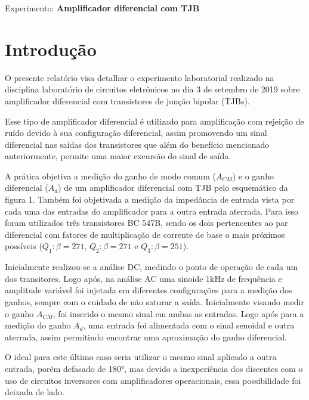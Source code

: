 \begin{center}
\large Experimento: \textbf{Amplificador diferencial com TJB}
\end{center}


\section{Introdução}



O presente relatório visa detalhar o experimento laboratorial realizado na disciplina laboratório de circuitos eletrônicos no dia 3 de setembro de 2019 sobre amplificador diferencial com transistores de junção bipolar (TJBs). 
 
Esse tipo de amplificador diferencial é utilizado para amplificação com rejeição de ruído devido à sua configuração diferencial, assim promovendo um sinal diferencial nas saídas dos transistores que além do benefício mencionado anteriormente, permite uma maior excursão do sinal de saída.

A prática objetiva a medição do ganho de modo comum ($A_{CM}$) e o ganho diferencial ($A_d$) de um amplificador diferencial com TJB pelo esquemático da figura 1. Também foi objetivada a medição da impedância de entrada vista por cada uma das entradas do amplificador para a outra entrada aterrada. Para isso foram utilizados três transistores BC 547B, sendo os dois pertencentes ao par diferencial com fatores de multiplicação de corrente de base o mais próximos possíveis ($Q_1: \beta = 271$, $Q_2: \beta = 271$ e $Q_3: \beta = 251$). 




Inicialmente realizou-se a análise DC, medindo o ponto de operação de cada um dos transitores. Logo após, na análise AC uma sinoide 1kHz de frequência e amplitude variável foi injetada em diferentes configurações para a medição dos ganhos, sempre com o cuidado de não saturar a saída. Inicialmente visando medir o ganho $A_{CM}$, foi inserido o mesmo sinal em ambas as entradas. Logo após para a medição do ganho $A_d$, uma entrada foi alimentada com o sinal senoidal e outra aterrada, assim permitindo encontrar uma aproximação do ganho diferencial.

O ideal para este último caso seria utilizar o mesmo sinal aplicado a outra entrada, porém defasado de 180°, mas devido a inexperiência dos discentes com o uso de circuitos inversores com amplificadores operacionais, essa possibilidade foi deixada de lado.

